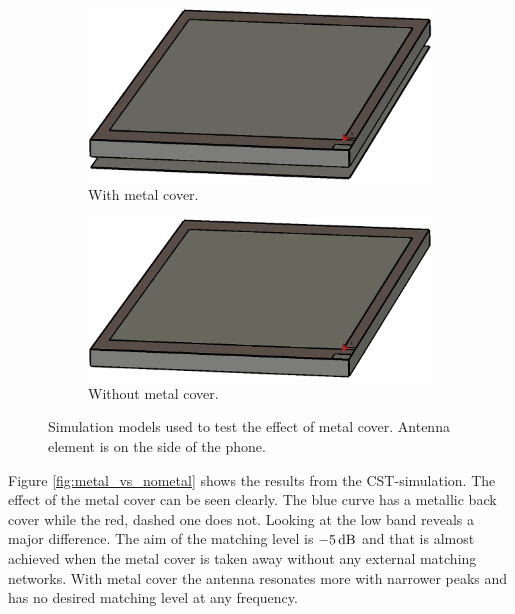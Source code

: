 \begin{figure}[H]
    \centering
    \begin{subfigure}[b]{0.49\textwidth}
    \includegraphics[width=\textwidth]{img/metal_cover.eps}
    \caption{With metal cover.}
    \label{fig:metal_cover}
    \end{subfigure}
    \begin{subfigure}[b]{0.49\textwidth}
    \includegraphics[width=\textwidth]{img/no_metal_cover.eps}
    \caption{Without metal cover.}
    \label{fig:nometal_cover}
    \end{subfigure}
    \caption{Simulation models used to test the effect of metal cover. Antenna element is on the side of the phone.}
    \label{fig:metal_vs_nometal_model}
\end{figure}

Figure \ref{fig:metal_vs_nometal} shows the results from the CST-simulation. The effect of the metal cover can be seen clearly. The blue curve has a metallic back cover while the red, dashed one does not. Looking at the low band reveals a major difference. The aim of the matching level is $-5\,\mathrm{dB}$ and that is almost achieved when the metal cover is taken away without any external matching networks. With metal cover the antenna resonates more with narrower peaks and has no desired matching level at any frequency. 

